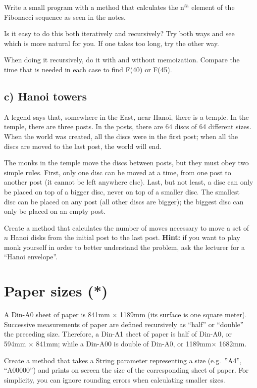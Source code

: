 \documentclass{article}
\begin{document}
Write a small program with a method that calculates the n$^{th}$ element
of the Fibonacci sequence as seen in the notes.

Is it easy to do this both iteratively and recursively? Try both ways
and see which is more natural for you. If one takes too long, try the
other way. 

When doing it recursively, do it with and without memoization. Compare
the time that is needed in each case to find F(40) or F(45). 

\subsection{c) Hanoi towers}

A legend says that, somewhere in the East, near Hanoi, there is a
temple. In the temple, there are three posts. In the posts, there are
64 discs of 64 different sizes. When the world was created, all the
discs were in the first post; when all the discs are moved to the
last post, the world will end. 

The monks in the temple move the discs between posts, but they must
obey two simple rules. First, only one disc can be moved at a time,
from one post to another post (it cannot be left anywhere else). Last,
but not least, a disc can only be placed on top of a bigger disc, never
on top of a smaller disc. The smallest disc can be placed
on any post (all other discs are bigger); the biggest disc can only be
placed on an empty post.

Create a method that calculates the number of moves necessary to move
a set of $n$ Hanoi disks from the initial post to the last post. 
\textbf{Hint:}
if you want to play monk yourself in order to better understand the
problem, ask the lecturer for a ``Hanoi envelope''. 

\section{Paper sizes (*)}
\label{sec:paper-sizes}

A Din-A0 sheet of paper is 841mm $\times$ 1189mm (its surface is one
square meter). Successive measurements of paper are defined
recursively as ``half'' or ``double'' the preceding size. Therefore,
a Din-A1 sheet of paper is half of Din-A0, or 594mm $\times$ 841mm;
while a Din-A00 is double of Din-A0, or 1189mm$\times$ 1682mm. 

Create a method that takes a String parameter representing a size
(e.g.~''A4'', ``A00000'') and prints on screen the size of the
corresponding sheet of paper. For simplicity, you can ignore rounding
errors when calculating smaller sizes. 
\end{document}
